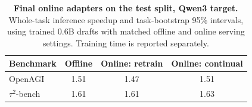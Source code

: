 \begin{table}[tbp]
\centering\small\setlength{\tabcolsep}{8pt}
\caption{\textbf{Final online adapters on the test split, Qwen3 target.} Whole-task inference speedup
and task-bootstrap 95\% intervals, using trained 0.6B drafts with matched offline and online serving settings. Training time is reported separately.}
\label{tab:online_final_ci}
\begin{tabular}{lccc}
\toprule
Benchmark & Offline & Online: retrain & Online: continual \\
\midrule
OpenAGI & \shortstack{1.51\xx{}\\{\fontsize{8}{9}\selectfont [1.38, 1.64]}} & \shortstack{1.47\xx{}\\{\fontsize{8}{9}\selectfont [1.31, 1.63]}} & \shortstack{1.51\xx{}\\{\fontsize{8}{9}\selectfont [1.40, 1.64]}} \\
$\tau^2$-bench & \shortstack{1.61\xx{}\\{\fontsize{8}{9}\selectfont [1.44, 1.79]}} & \shortstack{1.61\xx{}\\{\fontsize{8}{9}\selectfont [1.43, 1.81]}} & \shortstack{1.63\xx{}\\{\fontsize{8}{9}\selectfont [1.46, 1.83]}} \\
\bottomrule
\end{tabular}
\end{table}
